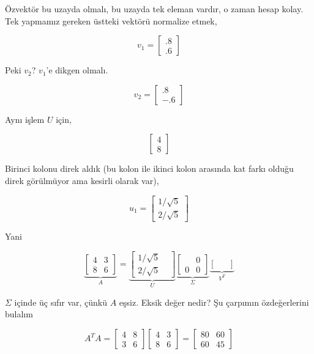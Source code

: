 \documentclass[12pt,fleqn]{article}\usepackage{../../common}
\begin{document}
Özvektör bu uzayda olmalı, bu uzayda tek eleman vardır, o zaman hesap
kolay. Tek yapmamız gereken üstteki vektörü normalize etmek, 

$$ 
v_1 = \left[\begin{array}{r}
.8 \\ .6
\end{array}\right]
 $$

Peki $v_2$? $v_1$'e dikgen olmalı. 

$$ 
v_2 = \left[\begin{array}{r}
.8 \\ -.6
\end{array}\right]
 $$

Aynı işlem $U$ için,

$$ 
\left[\begin{array}{r}
4 \\ 8
\end{array}\right]
 $$

Birinci kolonu direk aldık (bu kolon ile ikinci kolon arasında kat
farkı olduğu direk görülmüyor ama kesirli olarak var),

$$ 
u_1 = \left[\begin{array}{r}
1/\sqrt{ 5} \\ 2/\sqrt{ 5}
\end{array}\right]
 $$

Yani

$$ 
\underbrace{
\left[\begin{array}{rr}
4 & 3 \\ 8 & 6
\end{array}\right] 
}_{A}
=
\underbrace{
\left[\begin{array}{rr}
1/\sqrt{ 5} &  \\ 2/\sqrt{ 5} & 
\end{array}\right]
}_{U}
\underbrace{
\left[\begin{array}{rr}
 & 0 \\ 0 & 0
\end{array}\right]
}_{\Sigma}
\underbrace{
\left[\begin{array}{rr}
 & \\
 & 
\end{array}\right]
}_{V^T}
 $$

$\Sigma$ içinde üç sıfır var, çünkü $A$ eşsiz. Eksik değer nedir? Şu
çarpımın özdeğerlerini bulalım

$$ A^TA = 
\left[\begin{array}{rr}
4 & 8 \\ 3 & 6
\end{array}\right] 
\left[\begin{array}{rr}
4 & 3 \\ 8 & 6
\end{array}\right] =
\left[\begin{array}{rr}
80 & 60 \\ 60 & 45
\end{array}\right] 
 $$
\end{document}

